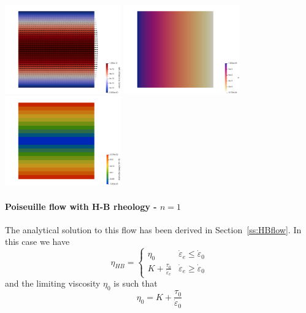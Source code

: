 \begin{center}
\includegraphics[width=5cm]{python_codes/fieldstone_61/results/poiseuille/vel}
\includegraphics[width=5cm]{python_codes/fieldstone_61/results/poiseuille/press}
\includegraphics[width=5cm]{python_codes/fieldstone_61/results/poiseuille/sr}
\end{center}

\paragraph{Poiseuille flow with H-B rheology - $n=1$} 
The analytical solution to this flow has been derived in Section~\ref{ss:HBflow}.
In this case we have 
\[
\eta_{HB}
=
\left\{
\begin{array}{lc}
\eta_0 & \dot{\varepsilon}_e\leq \dot{\varepsilon}_0 \\
K  + \frac{\tau_0}{\dot{\varepsilon}_e}  
& \dot{\varepsilon}_e\geq \dot{\varepsilon}_0 
\end{array}
\right.
\]
and the limiting viscosity $\eta_0$ is such that 
\[
\eta_0 = K  + \frac{\tau_0}{\dot{\varepsilon}_0}  
\]

